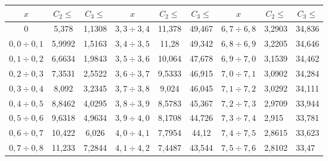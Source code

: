 \begin{table}\small 
\begin{center}
\vspace*{2ex}

\begin{tabular}{||c|c|c||c|c|c||c|l|l||}
\hline
$x$ & $C_2\leqslant$ & $C_3\leqslant$ & $x$ & $C_2\leqslant$ & $C_3\leqslant$ & $x$ & 
\multicolumn{1}{c|}{$C_2\leqslant$} & \multicolumn{1}{c||}{$C_3\leqslant$}\\
\hline
$       0   $ & \hphantom{9}5{,}378   &   \hphantom{99}1{,}1308  & $ 3{,}3  \div   3{,}4 $ & 11{,}378\hphantom{99}  &   49{,}467  & $ 6{,}7  \div   6{,}8 $ & 3{,}2903  &   34{,}836  \\
$   0{,}0    \div   0{,}1 $ & \hphantom{99}5{,}9992  &   \hphantom{99}1{,}5163  & $ 3{,}4  \div   3{,}5 $ & 11{,}28\hphantom{999}   &   49{,}342  & $ 6{,}8  \div   6{,}9 $ & 3{,}2205  &   34{,}646  \\
$   0{,}1  \div   0{,}2 $ & \hphantom{99}6{,}6634  &   \hphantom{99}1{,}9843  & $ 3{,}5  \div   3{,}6 $ & 10{,}064\hphantom{99}  &   47{,}678  & $ 6{,}9  \div   7{,}0   $ & 3{,}1539  &   34{,}462  \\
$   0{,}2  \div   0{,}3 $ & \hphantom{99}7{,}3531  &   \hphantom{99}2{,}5522  & $ 3{,}6  \div   3{,}7 $ & 9{,}5333  &   46{,}915  & $ 7{,}0    \div   7{,}1 $ & 3{,}0902  &   34{,}284  \\
$   0{,}3  \div   0{,}4 $ & \hphantom{9}8{,}092   &   \hphantom{99}3{,}2345  & $ 3{,}7  \div   3{,}8 $ & 9{,}024\hphantom{9}   &   46{,}045  & $ 7{,}1  \div   7{,}2 $ & 3{,}0292  &   34{,}111  \\
$   0{,}4  \div   0{,}5 $ & \hphantom{99}8{,}8462  &   \hphantom{99}4{,}0295  & $ 3{,}8  \div   3{,}9 $ & 8{,}5783  &   45{,}367  & $ 7{,}2  \div   7{,}3 $ & 2{,}9709  &   33{,}944  \\
$   0{,}5  \div   0{,}6 $ & \hphantom{99}9{,}6318  &   \hphantom{99}4{,}9634  & $ 3{,}9  \div   4{,}0 $ & 8{,}1708  &   44{,}726  & $ 7{,}3  \div   7{,}4 $ & 2{,}915   &   33{,}781  \\
$   0{,}6  \div   0{,}7 $ & 10{,}422  &   \hphantom{9}6{,}026   & $ 4{,}0  \div   4{,}1 $ & 7{,}7954  &   44{,}12\hphantom{9}   & $ 7{,}4  \div   7{,}5 $ & 2{,}8615  &   33{,}623  \\
$   0{,}7  \div   0{,}8 $ & 11{,}233  &   \hphantom{99}7{,}2844  & $ 4{,}1  \div   4{,}2 $ & 7{,}4487  &   43{,}544  & $ 7{,}5  \div   7{,}6 $ & 2{,}8102  &   33{,}47   \\

\end{tabular}
\end{center}
\end{table}
